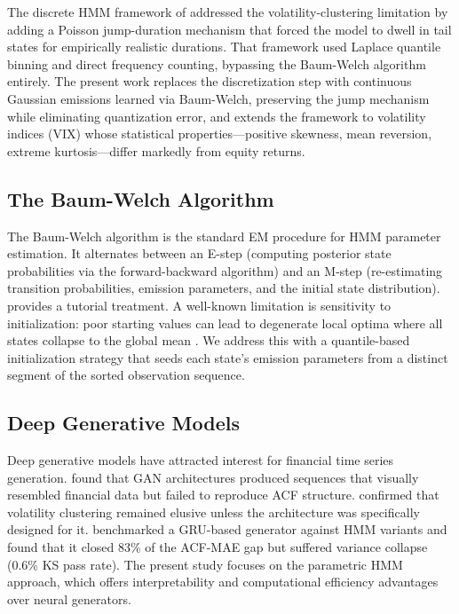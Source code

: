 The discrete HMM framework of \citet{alswaidan2026hybrid} addressed the volatility-clustering limitation by adding a Poisson jump-duration mechanism that forced the model to dwell in tail states for empirically realistic durations.
That framework used Laplace quantile binning and direct frequency counting, bypassing the Baum-Welch algorithm entirely.
The present work replaces the discretization step with continuous Gaussian emissions learned via Baum-Welch, preserving the jump mechanism while eliminating quantization error, and extends the framework to volatility indices (VIX) whose statistical properties---positive skewness, mean reversion, extreme kurtosis---differ markedly from equity returns.

\subsection{The Baum-Welch Algorithm}

The Baum-Welch algorithm \citep{baum1970maximization} is the standard EM procedure for HMM parameter estimation.
It alternates between an E-step (computing posterior state probabilities via the forward-backward algorithm) and an M-step (re-estimating transition probabilities, emission parameters, and the initial state distribution).
\citet{bilmes1998gentle} provides a tutorial treatment.
A well-known limitation is sensitivity to initialization: poor starting values can lead to degenerate local optima where all states collapse to the global mean \citep{rabiner1986introduction}.
We address this with a quantile-based initialization strategy that seeds each state's emission parameters from a distinct segment of the sorted observation sequence.

\subsection{Deep Generative Models}

Deep generative models have attracted interest for financial time series generation.
\citet{takahashi2019modeling} found that GAN architectures produced sequences that visually resembled financial data but failed to reproduce ACF structure.
\citet{kwon2024can} confirmed that volatility clustering remained elusive unless the architecture was specifically designed for it.
\citet{alswaidan2026hybrid} benchmarked a GRU-based generator against HMM variants and found that it closed 83\% of the ACF-MAE gap but suffered variance collapse (0.6\% KS pass rate).
The present study focuses on the parametric HMM approach, which offers interpretability and computational efficiency advantages over neural generators.
